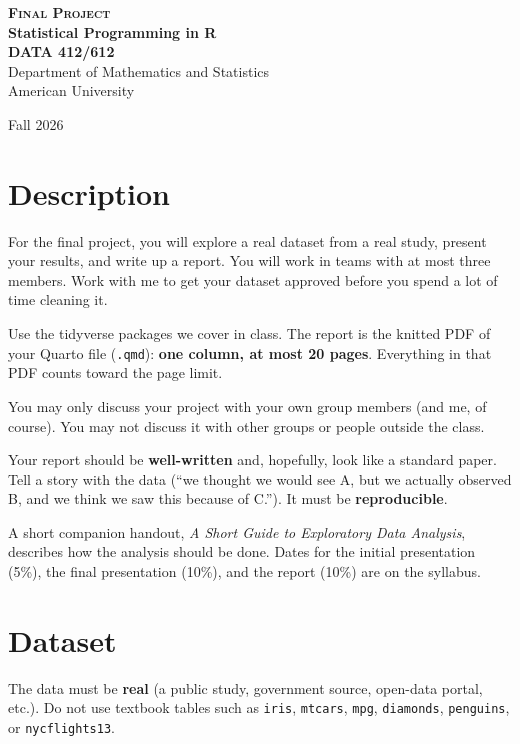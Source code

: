 \documentclass[11pt, a4paper]{article}
\begin{document}
\begin{center}
{\Large \textsc{\textbf{Final Project}}}
\\ \textbf{Statistical Programming in R}\\ \textbf{DATA 412/612} \\
Department of Mathematics and Statistics
\\
American University
\end{center}
\begin{center}
Fall 2026
\end{center}
\vspace{-0.6cm}

\section*{Description}

For the final project, you will explore a real dataset from a real study, present your results, and write up a report. You will work in teams with at most three members. Work with me to get your dataset approved before you spend a lot of time cleaning it.

Use the tidyverse packages we cover in class. The report is the knitted PDF of your Quarto file (\texttt{.qmd}): \textbf{one column, at most 20 pages}. Everything in that PDF counts toward the page limit.

You may only discuss your project with your own group members (and me, of course). You may not discuss it with other groups or people outside the class.

Your report should be \textbf{well-written} and, hopefully, look like a standard paper. Tell a story with the data (``we thought we would see A, but we actually observed B, and we think we saw this because of C.''). It must be \textbf{reproducible}.

A short companion handout, \emph{A Short Guide to Exploratory Data Analysis}, describes how the analysis should be done. Dates for the initial presentation (5\%), the final presentation (10\%), and the report (10\%) are on the syllabus.

\section*{Dataset}

The data must be \textbf{real} (a public study, government source, open-data portal, etc.). Do not use textbook tables such as \texttt{iris}, \texttt{mtcars}, \texttt{mpg}, \texttt{diamonds}, \texttt{penguins}, or \texttt{nycflights13}.
\end{document}
